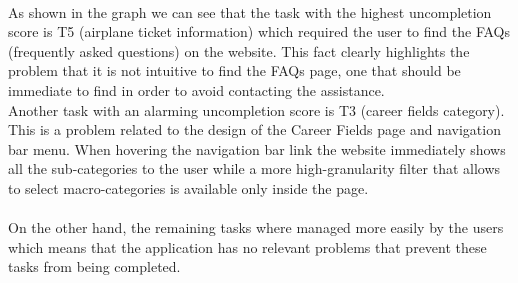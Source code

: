 \documentclass[11pt]{article} %
\begin{document}
\\
As shown in the graph we can see that the task with the highest uncompletion score is T5 (airplane ticket information) which required the user to find the FAQs (frequently asked questions) on the website.
This fact clearly highlights the problem that it is not intuitive to find the FAQs page, one that should be immediate to find in order to avoid contacting the assistance.\\
Another task with an alarming uncompletion score is T3 (career fields category). This is a problem related to the design of the Career Fields page and navigation bar menu. When hovering the navigation bar link the website immediately shows all the sub-categories to the user while a more high-granularity filter that allows to select macro-categories is available only inside the page.\\\\
On the other hand, the remaining tasks where managed more easily by the users which means that the application has no relevant problems that prevent these tasks from being completed.

\end{document}
